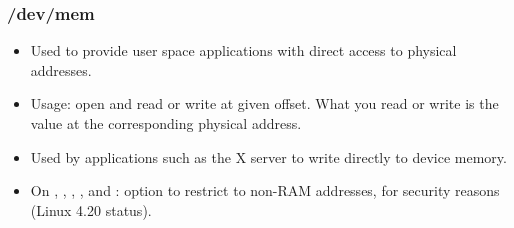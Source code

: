 \begin{frame}
  \frametitle{/dev/mem}
  \begin{itemize}
  \item Used to provide user space applications with direct access to
    physical addresses.
  \item Usage: open  and read or write at given offset.
    What you read or write is the value at the corresponding physical
    address.
  \item Used by applications such as the X server to write directly to
    device memory.
  \item On , , ,
    ,  and :
     option to restrict 
    to non-RAM addresses, for security reasons (Linux 4.20 status).
\end{itemize}
\end{frame}
